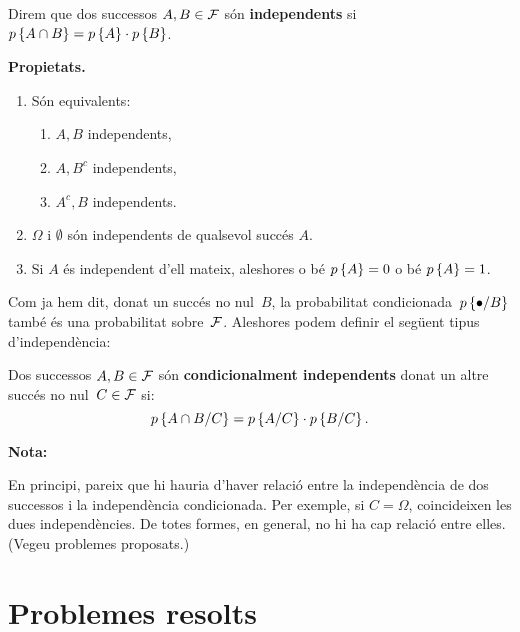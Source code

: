 \begin{defin}
Direm que dos successos $A, B \in {\cal F}$ s\'on {\bf
independents}
si \break $ p\left\{A \cap B\right\} = p\left\{A\right\} \cdot p\left\{B\right\}$.
\end{defin}

{\bf Propietats.}

\begin{enumerate}

\item S\'on equivalents:

\begin{enumerate}

\item $A, B$ independents,

\item $A, B^c$ independents,

\item $A^c, B$ independents.

\end{enumerate}

\item $\Omega$ i $\emptyset$ s\'on independents de qualsevol succ\'es $A$.

\item Si $A$ \'es independent d'ell mateix, aleshores o b\'e 
$p\left\{A\right\} = 0$ o b\'e $p\left\{A\right\} = 1$.

\end{enumerate}

Com ja hem dit, donat un succ\'es no nul~$B$, la probabilitat
condicionada~$p\left\{\bullet/B\right\}$
 tamb\'e \'es una probabilitat sobre~${\cal
F}$. Aleshores podem definir el seg\"uent tipus d'independ\`encia: 

\begin{defin}
Dos successos $A,B\in {\cal F}$ s\'on {\bf condicionalment independents}
 donat un altre
succ\'es no nul~$C\in {\cal F}$ si:
\[
p\left\{A\cap B/C\right\}=p\left\{A/C\right\}\cdot p\left\{B/C\right\}.
\]
\end{defin}

{\bf Nota:}

En principi, pareix que hi hauria d'haver relaci\'o entre la independ\`encia 
de dos successos i la independ\`encia condicionada. Per exemple, si
$C=\Omega$, coincideixen les dues independ\`encies. De totes formes, en
general, no hi ha cap relaci\'o entre elles. (Vegeu problemes
proposats.)

\section{Problemes resolts}


